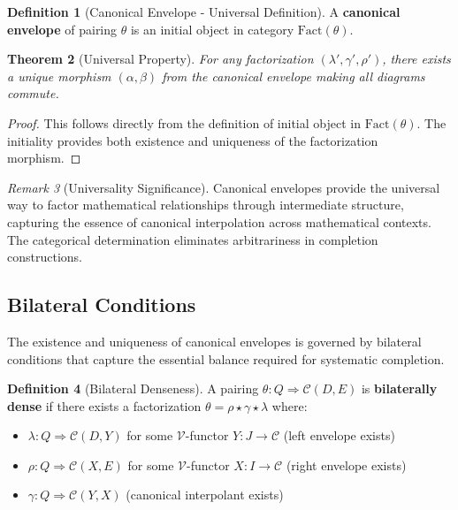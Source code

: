 \documentclass[11pt]{article}
\theoremstyle{plain}
\newtheorem{theorem}{Theorem}[section]
\theoremstyle{definition}
\newtheorem{definition}[theorem]{Definition}
\theoremstyle{remark}
\newtheorem{remark}[theorem]{Remark}
\newcommand{\V}{\mathcal{V}}
\newcommand{\C}{\mathcal{C}}
\newcommand{\Fact}{\mathrm{Fact}}
\begin{document}
\begin{definition}[Canonical Envelope - Universal Definition]
A \textbf{canonical envelope} of pairing $\theta$ is an initial object in category $\Fact(\theta)$.
\end{definition}

\begin{theorem}[Universal Property]
For any factorization $(\lambda', \gamma', \rho')$, there exists a unique morphism $(\alpha, \beta)$ from the canonical envelope making all diagrams commute.
\end{theorem}

\begin{proof}
This follows directly from the definition of initial object in $\Fact(\theta)$. The initiality provides both existence and uniqueness of the factorization morphism.
\end{proof}

\begin{remark}[Universality Significance]
Canonical envelopes provide the universal way to factor mathematical relationships through intermediate structure, capturing the essence of canonical interpolation across mathematical contexts. The categorical determination eliminates arbitrariness in completion constructions.
\end{remark}

\subsection{Bilateral Conditions}

The existence and uniqueness of canonical envelopes is governed by bilateral conditions that capture the essential balance required for systematic completion.

\begin{definition}[Bilateral Denseness]
A pairing $\theta : Q \Rightarrow \C(D, E)$ is \textbf{bilaterally dense} if there exists a factorization $\theta = \rho \star \gamma \star \lambda$ where:
\begin{itemize}
\item $\lambda : Q \Rightarrow \C(D, Y)$ for some $\V$-functor $Y : J \to \C$ (left envelope exists)
\item $\rho : Q \Rightarrow \C(X, E)$ for some $\V$-functor $X : I \to \C$ (right envelope exists)
\item $\gamma : Q \Rightarrow \C(Y, X)$ (canonical interpolant exists)
\end{itemize}
\end{definition}
\end{document}
